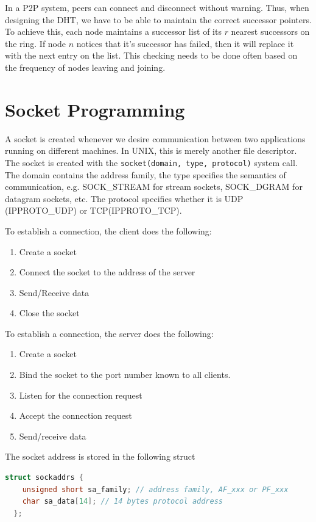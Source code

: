 \documentclass[12pt,letterpaper]{book}
\theoremstyle{definition}
\begin{document}
In a P2P system, peers can connect and disconnect without warning. Thus, when designing the DHT, we have to be able to maintain the correct successor pointers. To achieve this, each node maintains a successor list of its $r$ nearest successors on the ring. If node $n$ notices that it's successor has failed, then it will replace it with the next entry on the list. This checking needs to be done often based on the frequency of nodes leaving and joining.

\section{Socket Programming}

A socket is created whenever we desire communication between two applications running on different machines. In UNIX, this is merely another file descriptor. The socket is created with the \texttt{socket(domain, type, protocol)} system call. The domain contains the address family, the type specifies the semantics of communication, e.g. SOCK\_STREAM for stream sockets, SOCK\_DGRAM for datagram sockets, etc. The protocol specifies whether it is UDP (IPPROTO\_UDP) or TCP(IPPROTO\_TCP).

To establish a connection, the client does the following:

\begin{enumerate}
  \item Create a socket
  \item Connect the socket to the address of the server
  \item Send/Receive data
  \item Close the socket
\end{enumerate}

To establish a connection, the server does the following:

\begin{enumerate}
  \item Create a socket
  \item Bind the socket to the port number known to all clients.
  \item Listen for the connection request
  \item Accept the connection request
  \item Send/receive data
\end{enumerate}

The socket address is stored in the following struct

\begin{lstlisting}[language=c]
  struct sockaddrs {
    unsigned short sa_family; // address family, AF_xxx or PF_xxx
    char sa_data[14]; // 14 bytes protocol address
  };
\end{lstlisting}
\end{document}
